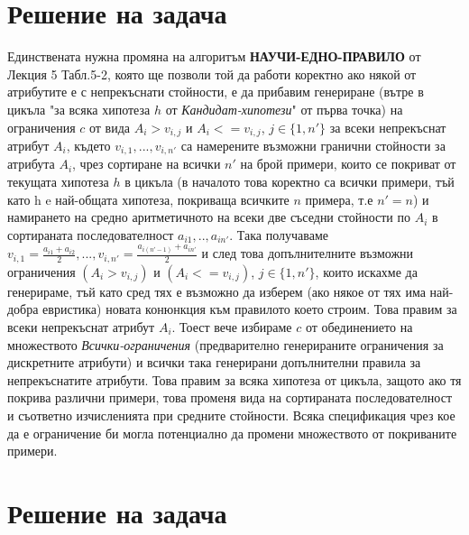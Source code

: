 \documentclass[12pt]{article}
\begin{document}
	
	
	\tableofcontents
	
	
	
	\newpage
	
	\section{Решение на задача }
	
	Единствената нужна промяна на алгоритъм \textbf{НАУЧИ-ЕДНО-ПРАВИЛО} от Лекция 5 Табл.5-2, която ще позволи той да работи коректно ако някой от атрибутите е с непрекъснати стойности, е да прибавим генериране (вътре в цикъла "за всяка хипотеза $h$ от \textit{Кандидат-хипотези}" от първа точка) на ограничения $c$ от вида $A_{i} > v_{i,j}$ и $A_{i} <= v_{i,j}$, $j \in \{1, n'\}$ за всеки непрекъснат атрибут $A_{i}$, където $v_{i,1},...,v_{i,n'}$ са намерените възможни гранични стойности за атрибута $A_i$, чрез сортиране на всички $n'$ на брой примери, които се покриват от текущата хипотеза $h$ в цикъла (в началото това коректно са всички примери, тъй като h e най-общата хипотеза, покриваща всичките $n$ примера, т.е $n' = n$) и намирането на средно аритметичното на всеки две съседни стойности по $A_{i}$ в сортираната последователност $a_{i1},..,a_{in'}$. 
	\newline\newline Така получаваме $v_{i,1} = \frac{a_{i1}+a_{i2}}{2},...,v_{i,n'} = \frac{a_{i(n'-1)}+a_{in'}}{2}$ и след това допълнителните възможни ограничения $(A_{i} > v_{i,j})$ и $(A_{i} <= v_{i,j})$, $j \in \{1, n'\}$, които искахме да генерираме, тъй като сред тях е възможно да изберем (ако някое от тях има най-добра евристика) новата конюнкция към правилото което строим.
	Това правим за всеки непрекъснат атрибут $A_{i}$. Тоест вече избираме $c$ от обединението на множеството \textit{Всички-ограничения} (предварително генерираните ограничения за дискретните атрибути) и всички така генерирани допълнителни правила за непрекъснатите атрибути.  Това правим за всяка хипотеза от цикъла, защото ако тя покрива различни примери, това променя вида на сортираната последователност и съответно изчисленията при средните стойности. Всяка спецификация чрез кое да е ограничение би могла потенциално да промени множеството от покриваните примери.
	

	\newpage
	
	\section{Решение на задача }
	
\end{document}

